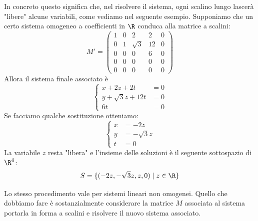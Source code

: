 \begin{observation}
	In concreto questo significa che, nel risolvere il sistema, ogni scalino
	lungo lascerà "libere" alcune variabili, come vediamo nel seguente esempio.
	Supponiamo che un certo sistema omogeneo a coefficienti in $\R$
	conduca alla matrice a scalini:
	\[
		M' = \begin{pmatrix}
			1 & 0 & 2        & 2  & 0 \\
			0 & 1 & \sqrt{3} & 12 & 0 \\
			0 & 0 & 0        & 6  & 0 \\
			0 & 0 & 0        & 0  & 0 \\
			0 & 0 & 0        & 0  & 0
		\end{pmatrix}
	\]
	Allora il sistema finale associato è
	\[
		\begin{cases}
			x + 2z + 2t         & = 0 \\
			y + \sqrt{3}z + 12t & = 0 \\
			6t                  & = 0
		\end{cases}
	\]
	Se facciamo qualche sostituzione otteniamo:
	\[
		\begin{cases}
			x & = -2z         \\
			y & = -\sqrt{3} z \\
			t & = 0
		\end{cases}
	\]
	La variabile $z$ resta "libera" e l'insieme delle soluzioni è il seguente
	sottospazio di $\R^4$:
	\[
		S = \{ (-2z, -\sqrt{3}z, z, 0 ) \mid z \in \R \}
	\]
\end{observation}

Lo stesso procedimento vale per sistemi lineari non omogenei.
Quello che dobbiamo fare è sostanzialmente considerare la matrice $M$ associata
al sistema portarla in forma a scalini e risolvere il nuovo sistema associato.

